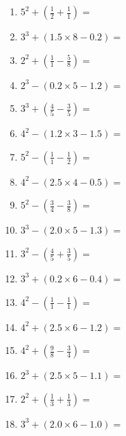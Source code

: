 \documentclass[12pt]{article}
\begin{document}
\begin{enumerate}
\item \large $ 5^{2} + (\frac{1}{2} + \frac{1}{1}) = $ \vspace{1.6cm}
\item \large $ 3^{3} + (1.5 \times 8 - 0.2) = $ \vspace{1.6cm}
\item \large $ 2^{2} + (\frac{1}{1} - \frac{5}{8}) = $ \vspace{1.6cm}
\item \large $ 2^{3} - (0.2 \times 5 - 1.2) = $ \vspace{1.6cm}
\newpage
\item \large $ 3^{3} + (\frac{4}{5} - \frac{3}{5}) = $ \vspace{1.6cm}
\item \large $ 4^{2} - (1.2 \times 3 - 1.5) = $ \vspace{1.6cm}
\item \large $ 5^{2} - (\frac{1}{1} - \frac{1}{2}) = $ \vspace{1.6cm}
\item \large $ 4^{2} - (2.5 \times 4 - 0.5) = $ \vspace{1.6cm}
\item \large $ 5^{2} - (\frac{3}{4} - \frac{3}{8}) = $ \vspace{1.6cm}
\item \large $ 3^{3} - (2.0 \times 5 - 1.3) = $ \vspace{1.6cm}
\item \large $ 3^{2} - (\frac{4}{5} + \frac{3}{5}) = $ \vspace{1.6cm}
\item \large $ 3^{3} + (0.2 \times 6 - 0.4) = $ \vspace{1.6cm}
\item \large $ 4^{2} - (\frac{1}{1} - \frac{1}{1}) = $ \vspace{1.6cm}
\item \large $ 4^{2} + (2.5 \times 6 - 1.2) = $ \vspace{1.6cm}
\newpage
\item \large $ 4^{2} + (\frac{9}{8} - \frac{3}{4}) = $ \vspace{1.6cm}
\item \large $ 2^{3} + (2.5 \times 5 - 1.1) = $ \vspace{1.6cm}
\item \large $ 2^{2} + (\frac{1}{3} + \frac{1}{3}) = $ \vspace{1.6cm}
\item \large $ 3^{3} + (2.0 \times 6 - 1.0) = $ \vspace{1.6cm}

\end{enumerate}
\end{document}
